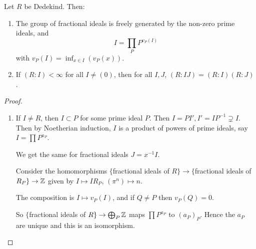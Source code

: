 \documentclass[10pt,a4paper]{article}
\begin{document}
\begin{theorem}
  Let $R$ be Dedekind. Then:
  \begin{enumerate}
    \item The group of fractional ideals is freely generated by the non-zero prime ideals, and
    \[I = \prod_P P^{v_P(I)}\]
    with $v_P(I) = \inf_{x\in I}(v_P(x))$.
    \item If $(R:I) < \infty$ for all $I \neq (0)$, then for all $I, J$, $(R: IJ) = (R:I)(R:J)$.
  \end{enumerate}
\end{theorem}
\begin{proof}\hspace*{0cm}
  \begin{enumerate}
    \item If $I \neq R$, then $I \subset P$ for some prime ideal $P$. Then $I = PI', I' = IP^{-1} \supsetneq I$. Then by Noetherian induction, $I$ is a product of powers of prime ideals, say $I = \prod P^{a_P}$.

    We get the same for fractional ideals $J = x^{-1} I$.

    Consider the homomorphisms $\{$fractional ideals of $R\}\to\{$fractional ideals of $R_P\}\to\mathbb{Z}$ given by $I \mapsto IR_P$, $(\pi^n)\mapsto n$.

    The composition is $I \mapsto v_P(I)$, and if $Q \neq P$ then $v_P(Q) = 0$.

    So $\{$fractional ideals of $R\}\to \bigoplus_P \mathbb{Z}$ maps $\prod P^{a_P}$ to $(a_P)_P$. Hence the $a_P$ are unique and this is an isomorphism.
  \end{enumerate}
\end{proof}
\end{document}
